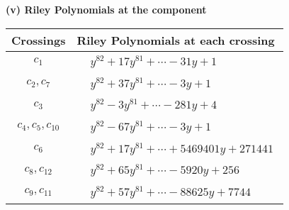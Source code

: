 \documentclass[1p]{elsarticle_modified}
\theoremstyle{definition}
\begin{document}
\newpage\renewcommand{\arraystretch}{1}
\flushleft \textbf{(v) Riley Polynomials at the component}\newline \\
\begin{tabular}{m{50pt}|m{274pt}}
Crossings & \hspace{64pt}Riley Polynomials at each crossing \\
\hline $$\begin{aligned}c_{1}\end{aligned}$$&$\begin{aligned}
&y^{82}+17 y^{81}+\cdots-31 y+1
\end{aligned}$\\
\hline $$\begin{aligned}c_{2},c_{7}\end{aligned}$$&$\begin{aligned}
&y^{82}+37 y^{81}+\cdots-3 y+1
\end{aligned}$\\
\hline $$\begin{aligned}c_{3}\end{aligned}$$&$\begin{aligned}
&y^{82}-3 y^{81}+\cdots-281 y+4
\end{aligned}$\\
\hline $$\begin{aligned}c_{4},c_{5},c_{10}\end{aligned}$$&$\begin{aligned}
&y^{82}-67 y^{81}+\cdots-3 y+1
\end{aligned}$\\
\hline $$\begin{aligned}c_{6}\end{aligned}$$&$\begin{aligned}
&y^{82}+17 y^{81}+\cdots+5469401 y+271441
\end{aligned}$\\
\hline $$\begin{aligned}c_{8},c_{12}\end{aligned}$$&$\begin{aligned}
&y^{82}+65 y^{81}+\cdots-5920 y+256
\end{aligned}$\\
\hline $$\begin{aligned}c_{9},c_{11}\end{aligned}$$&$\begin{aligned}
&y^{82}+57 y^{81}+\cdots-88625 y+7744
\end{aligned}$\\
\hline
\end{tabular}\\~\\
\end{document}
